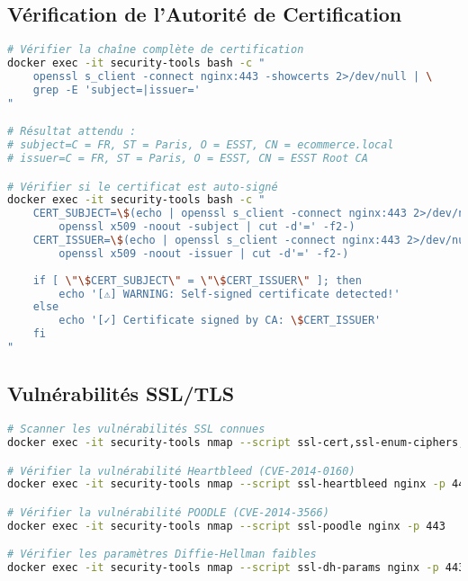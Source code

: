 \documentclass[11pt,a4paper]{report}
\begin{document}
\subsection{Vérification de l'Autorité de Certification}

\begin{lstlisting}[language=bash, caption=Analyse de la Chaîne de Certification]
# Vérifier la chaîne complète de certification
docker exec -it security-tools bash -c "
    openssl s_client -connect nginx:443 -showcerts 2>/dev/null | \
    grep -E 'subject=|issuer='
"

# Résultat attendu :
# subject=C = FR, ST = Paris, O = ESST, CN = ecommerce.local
# issuer=C = FR, ST = Paris, O = ESST, CN = ESST Root CA

# Vérifier si le certificat est auto-signé
docker exec -it security-tools bash -c "
    CERT_SUBJECT=\$(echo | openssl s_client -connect nginx:443 2>/dev/null | \
        openssl x509 -noout -subject | cut -d'=' -f2-)
    CERT_ISSUER=\$(echo | openssl s_client -connect nginx:443 2>/dev/null | \
        openssl x509 -noout -issuer | cut -d'=' -f2-)
    
    if [ \"\$CERT_SUBJECT\" = \"\$CERT_ISSUER\" ]; then
        echo '[⚠] WARNING: Self-signed certificate detected!'
    else
        echo '[✓] Certificate signed by CA: \$CERT_ISSUER'
    fi
"
\end{lstlisting}

\subsection{Vulnérabilités SSL/TLS}

\begin{lstlisting}[language=bash, caption=Scan des Vulnérabilités SSL avec nmap]
# Scanner les vulnérabilités SSL connues
docker exec -it security-tools nmap --script ssl-cert,ssl-enum-ciphers,ssl-heartbleed,ssl-poodle,ssl-dh-params nginx -p 443

# Vérifier la vulnérabilité Heartbleed (CVE-2014-0160)
docker exec -it security-tools nmap --script ssl-heartbleed nginx -p 443

# Vérifier la vulnérabilité POODLE (CVE-2014-3566)
docker exec -it security-tools nmap --script ssl-poodle nginx -p 443

# Vérifier les paramètres Diffie-Hellman faibles
docker exec -it security-tools nmap --script ssl-dh-params nginx -p 443
\end{lstlisting}
\end{document}
